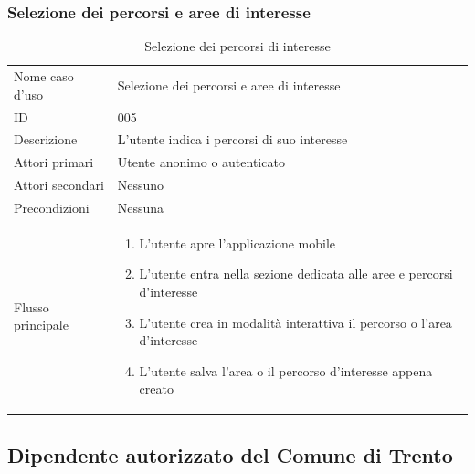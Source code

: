 \documentclass{article}
\begin{document}
\subsubsection{Selezione dei percorsi e aree di interesse}

\begin{table}[htbp]
    \label{8.2.4}
    \centering
    \begin{tabularx}{\textwidth}{| l | p{} |}
        \Xhline{2pt} %
        Nome caso d'uso & Selezione dei percorsi e aree di interesse \\
        \Xhline{2pt} %
        ID & 005 \\
        \hline
        Descrizione & L'utente indica i percorsi di suo interesse\\
        \hline
        Attori primari & Utente anonimo o autenticato\\
        \hline
        Attori secondari & Nessuno \\
        \hline
        Precondizioni & Nessuna \\
        \hline
        Flusso principale & 
        \begin{enumerate}[topsep=5pt,partopsep=0pt,parsep=0pt,itemsep=0pt,before=\vspace{-\baselineskip},after=\vspace{-\baselineskip}]                
            \item L'utente apre l'applicazione mobile
            \item L'utente entra nella sezione dedicata alle aree e percorsi d'interesse
            \item L'utente crea in modalità interattiva il percorso o l'area d'interesse
            \item L'utente salva l'area o il percorso d'interesse appena creato
        \end{enumerate}
        \\
        \hline
    \end{tabularx}
    \caption{Selezione dei percorsi di interesse}
    \label{tab:tabella_use_case004}
\end{table}

\clearpage


\subsection{Dipendente autorizzato del Comune di Trento}
\end{document}
